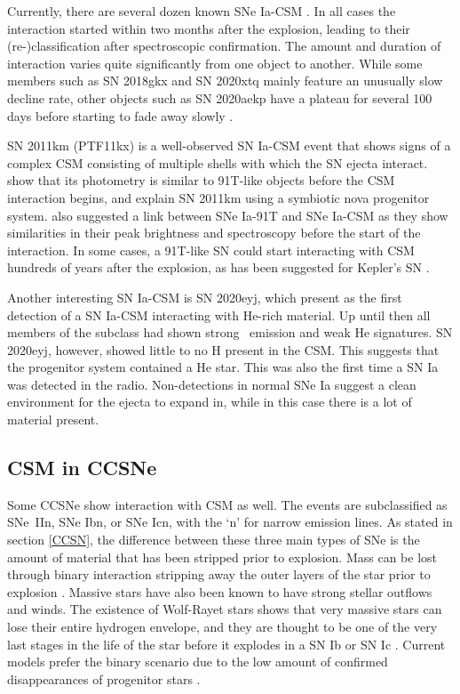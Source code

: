 \documentclass[a4paper,oneside,12pt, class=Latex/Classes/PhDthesisPSnPDF, crop=false]{standalone}
\begin{document}
Currently, there are several dozen known SNe Ia-CSM \citep{2005gj, Ia-CSM_Silverman, Ia-CSM_BTS}. In all cases the interaction started within two months after the explosion, leading to their (re-)classification after spectroscopic confirmation. The amount and duration of interaction varies quite significantly from one object to another. While some members such as SN 2018gkx and SN 2020xtq mainly feature an unusually slow decline rate, other objects such as SN 2020aekp have a plateau for several 100 days before starting to fade away slowly \citep{Ia-CSM_BTS}.

SN 2011km (PTF11kx) is a well-observed SN Ia-CSM event that shows signs of a complex CSM consisting of multiple shells with which the SN ejecta interact. \citet{ptf11kx} show that its photometry is similar to 91T-like objects before the CSM interaction begins, and explain SN 2011km using a symbiotic nova progenitor system. \citet{Ia-CSM_and_91T_connection} also suggested a link between SNe Ia-91T and SNe Ia-CSM as they show similarities in their peak brightness and spectroscopy before the start of the interaction. In some cases, a 91T-like SN could start interacting with CSM hundreds of years after the explosion, as has been suggested for Kepler’s SN \citet{Kepler_91T, Kepler_CSM}.

Another interesting SN Ia-CSM is SN 2020eyj, which \citet{Kool_He_CSM} present as the first detection of a SN Ia-CSM interacting with He-rich material. Up until then all members of the subclass had shown strong \Halpha\ emission and weak He signatures. SN 2020eyj, however, showed little to no H present in the CSM. This suggests that the progenitor system contained a He star. This was also the first time a SN Ia was detected in the radio. Non-detections in normal SNe Ia suggest a clean environment for the ejecta to expand in, while in this case there is a lot of material present.


\subsection{CSM in CCSNe}
Some CCSNe show interaction with CSM as well. The events are subclassified as SNe~IIn, SNe Ibn, or SNe Icn, with the `n' for narrow emission lines. As stated in section \ref{CCSN}, the difference between these three main types of SNe is the amount of material that has been stripped prior to explosion. Mass can be lost through binary interaction stripping away the outer layers of the star prior to explosion \citep{Ic_binary_progenitors}. Massive stars have also been known to have strong stellar outflows and winds. The existence of Wolf-Rayet stars shows that very massive stars can lose their entire hydrogen envelope, and they are thought to be one of the very last stages in the life of the star before it explodes in a SN Ib or SN Ic \citep{WR_as_progenitors, 2019hgp}. Current models prefer the binary scenario due to the low amount of confirmed disappearances of progenitor stars \citep{CCSN_disappeared_progenitor}.
\end{document}
